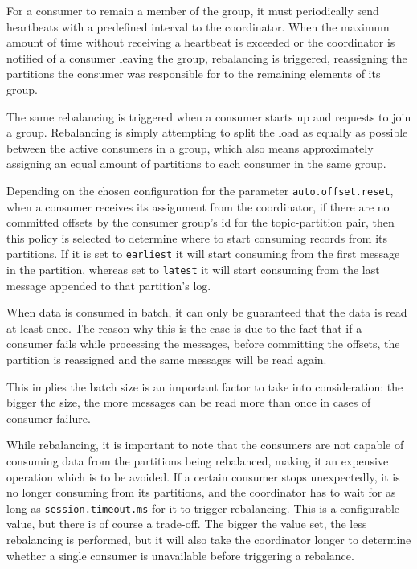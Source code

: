 For a consumer to remain a member of the group, it must periodically send heartbeats with a predefined interval to the coordinator. When the maximum amount of time without receiving a heartbeat is exceeded or the coordinator is notified of a consumer leaving the group, rebalancing is triggered, reassigning the partitions the consumer was responsible for to the remaining elements of its group.

The same rebalancing is triggered when a consumer starts up and requests to join a group. Rebalancing is simply attempting to split the load as equally as possible between the active consumers in a group, which also means approximately assigning an equal amount of partitions to each consumer in the same group. 

Depending on the chosen configuration for the parameter \texttt{auto.offset.reset}, when a consumer receives its assignment from the coordinator, if there are no committed offsets by the consumer group's id for the topic-partition pair, then this policy is selected to determine where to start consuming records from its partitions. If it is set to \texttt{earliest} it will start consuming from the first message in the partition, whereas set to \texttt{latest} it will start consuming from the last message appended to that partition's log.

When data is consumed in batch, it can only be guaranteed that the data is read at least once. The reason why this is the case is due to the fact that if a consumer fails while processing the messages, before committing the offsets, the partition is reassigned and the same messages will be read again. 

This implies the batch size is an important factor to take into consideration: the bigger the size, the more messages can be read more than once in cases of consumer failure.

While rebalancing, it is important to note that the consumers are not capable of consuming data from the partitions being rebalanced, making it an expensive operation which is to be avoided. If a certain consumer stops unexpectedly, it is no longer consuming from its partitions, and the coordinator has to wait for as long as \texttt{session.timeout.ms} for it to trigger rebalancing. This is a configurable value, but there is of course a trade-off. The bigger the value set, the less rebalancing is performed, but it will also take the coordinator longer to determine whether a single consumer is unavailable before triggering a rebalance. 

